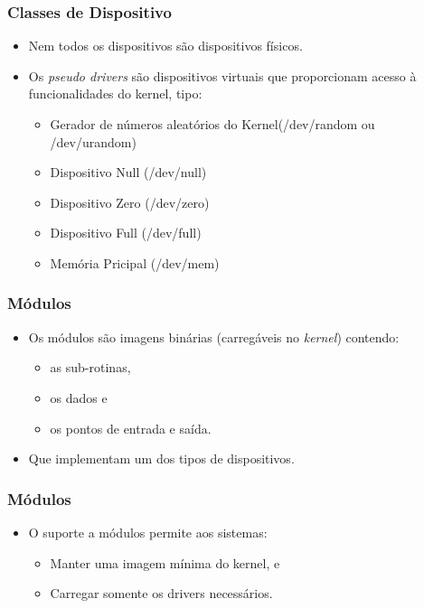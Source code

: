 \begin{frame}
	\frametitle{Classes de Dispositivo}
	\begin{itemize}
		\item<1-> Nem todos os dispositivos são dispositivos físicos.
		\item<2-> Os \textit{pseudo drivers} são dispositivos virtuais que proporcionam acesso à funcionalidades do kernel, tipo:
		\begin{itemize}
			\item<3-> Gerador de números aleatórios do Kernel(/dev/random ou /dev/urandom)
			\item<4-> Dispositivo Null (/dev/null)
			\item<5-> Dispositivo Zero (/dev/zero)
			\item<6-> Dispositivo Full (/dev/full)
			\item<7-> Memória Pricipal (/dev/mem)
		\end{itemize}
	\end{itemize}
\end{frame}

\begin{frame}
	\frametitle{Módulos}
	\begin{itemize}
		\item<1-> Os módulos são imagens binárias (carregáveis no \textit{kernel}) contendo:
		\begin{itemize}
			\item<2-> as sub-rotinas, 
			\item<3-> os dados e 
			\item<4-> os pontos de entrada e saída.
		\end{itemize}
		\item<5-> Que implementam um dos tipos de dispositivos.
	\end{itemize}
\end{frame}


\begin{frame}
	\frametitle{Módulos}
	\begin{itemize}
		\item<1-> O suporte a módulos permite aos sistemas:
		\begin{itemize}
			\item<2-> Manter uma imagem mínima do kernel, e
			\item<3-> Carregar somente os drivers necessários.
		\end{itemize}
	\end{itemize}
\end{frame}
